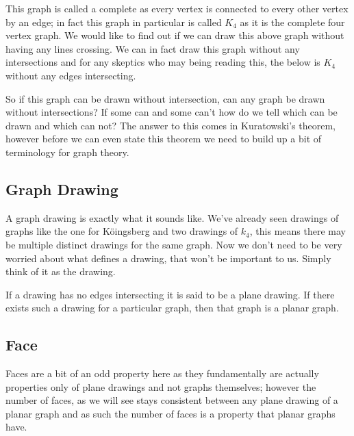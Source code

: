 \documentclass{article}
\begin{document}
This graph is called a complete as every vertex is connected to every other vertex by an edge; in fact this graph in particular is called $K_4$ as it is the complete four vertex graph. We would like to find out if we can draw this above graph without having any lines crossing. We can in fact draw this graph without any intersections and for any skeptics who may being reading this, the below is $K_4$ without any edges intersecting.

\begin{center}
\end{center}

So if this graph can be drawn without intersection, can any graph be drawn without intersections? If some can and some can't how do we tell which can be drawn and which can not? The answer to this comes in Kuratowski's theorem, however before we can even state this theorem we need to build up a bit of terminology for graph theory.

\subsection{Graph Drawing}
A graph drawing is exactly what it sounds like. We've already seen drawings of graphs like the one for K\"oingsberg and two drawings of $k_4$, this means there may be multiple distinct drawings for the same graph. Now we don't need to be very worried about what defines a drawing, that won't be important to us. Simply think of it as the drawing.

If a drawing has no edges intersecting it is said to be a plane drawing. If there exists such a drawing for a particular graph, then that graph is a planar graph.

\subsection{Face}
Faces are a bit of an odd property here as they fundamentally are actually properties only of plane drawings and not graphs themselves; however the number of faces, as we will see stays consistent between any plane drawing of a planar graph and as such the number of faces is a property that planar graphs have.
\end{document}
